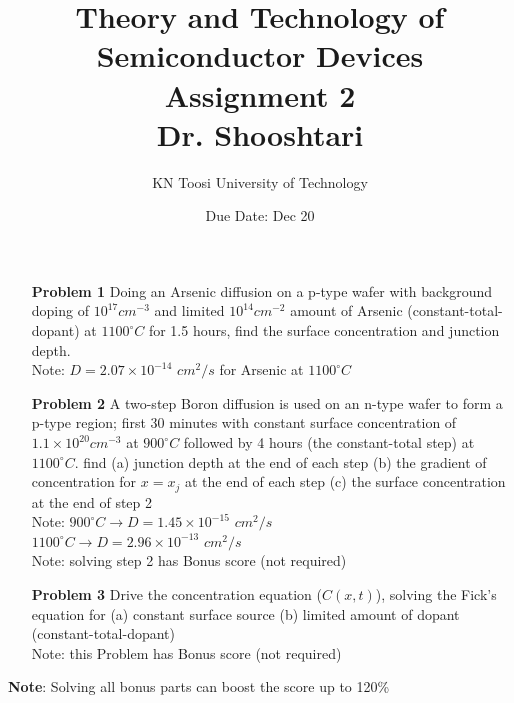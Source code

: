 \documentclass{report}
\title{Theory and Technology of Semiconductor Devices\\ Assignment 2 \\ \vspace{30pt} Dr. Shooshtari}
\author{KN Toosi University of Technology}
\date{Due Date: Dec 20}
\begin{document}
	\maketitle
	
	\begin{enumerate}
		\item[\bf{Problem 1}] Doing an Arsenic diffusion on a p-type wafer with background doping of $10^{17} cm^{-3}$ and limited $10^{14} cm^{-2}$ amount of Arsenic (constant-total-dopant) at $1100^{\circ} C$ for 1.5 hours, find the surface concentration and junction depth. \\
		Note: $D=2.07\times 10^{-14}$ $cm^2/s$ for Arsenic at $1100^{\circ} C$
		
		\item[\bf{Problem 2}] A two-step Boron diffusion is used on an n-type wafer to form a p-type region; first 30 minutes with constant surface concentration of $1.1\times 10^{20} cm^{-3}$ at $900^{\circ} C$ followed by 4 hours (the constant-total step) at $1100^{\circ} C$. find (a) junction depth at the end of each step (b) the gradient of concentration for $x=x_j$ at the end of each step (c) the surface concentration at the end of step 2\\
		Note: $900^{\circ} C \rightarrow D = 1.45\times 10^{-15}$ $cm^{2}/s$ \\
		$1100^{\circ} C \rightarrow D = 2.96\times 10^{-13}$ $cm^{2}/s$ \\
		Note: solving step 2 has Bonus score (not required)
		
		\item[\bf{Problem 3}] Drive the concentration equation ($C(x,t)$), solving the Fick's equation for (a) constant surface source (b) limited amount of dopant (constant-total-dopant) \\
		Note: this Problem has Bonus score (not required)
	\end{enumerate}
	\vspace{120pt}
	\hspace{-35pt} \textbf{Note}: Solving all bonus parts can boost the score up to 120\% 
\end{document}
